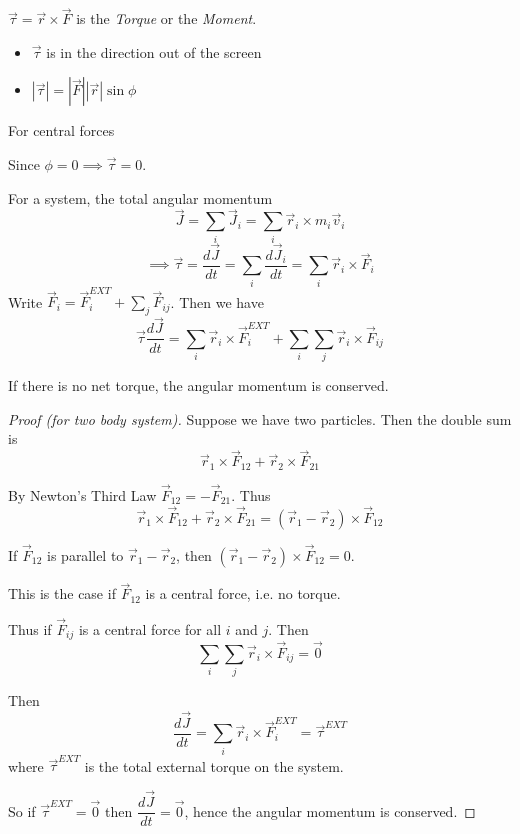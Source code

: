 \documentclass[10pt]{scrartcl}
\begin{document}
\begin{definition}
$\vec{\tau} = \vec{r} \times \vec{F}$ is the \emph{Torque} or the \emph{Moment}. 
\vspace*{50pt}
\begin{itemize}
\item $\vec{\tau}$ is in the direction out of the screen
\item $|\vec{\tau}| = |\vec{F}||\vec{r}|\sin\phi$ 	
\end{itemize}
\end{definition}

For central forces 
\vspace*{50pt}

Since $\phi = 0 \implies \vec{\tau} = 0$. 

For a system, the total angular momentum
\[\vec{J} = \sum_{i}\vec{J}_i = \sum_i\vec{r}_i \times m_i \vec{v}_i\]
\[\implies \vec{\tau} = \frac{d\vec{J}}{dt} = \sum_i\dfrac{d\vec{J}_i}{dt} = \sum_i\vec{r}_i\times\vec{F}_i\]
Write $\vec{F}_i = \vec{F}_i^{EXT} + \sum_j\vec{F}_{ij}$. Then we have
\begin{equation} \vec{\tau} \frac{d\vec{J}}{dt} = \sum_i\vec{r}_i\times\vec{F}_i^{EXT} + \sum_i\sum_j\vec{r}_i\times\vec{F}_{ij}\end{equation}


\begin{theorem}
If there is no net torque, the angular momentum is conserved.
\end{theorem}

\begin{proof}[Proof (for two body system)]

Suppose we have two particles. Then the double sum is 
\[\vec{r}_1 \times\vec{F}_{12} +\vec{r}_2 \times\vec{F}_{21} \]

By Newton's Third Law $\vec{F}_{12} = -\vec{F}_{21}$. Thus
\[\vec{r}_1 \times\vec{F}_{12} +\vec{r}_2 \times\vec{F}_{21} = (\vec{r}_1 - \vec{r}_2) \times \vec{F}_{12}\]

If $\vec{F}_{12}$ is parallel to $\vec{r}_1 - \vec{r}_2$, then $(\vec{r}_1 - \vec{r}_2) \times \vec{F}_{12} = 0$. 

This is the case if $\vec{F}_{12}$ is a central force, i.e. no torque. 

Thus if $\vec{F}_{ij}$ is a central force for all $i$ and $j$. Then 
\[\sum_i\sum_j \vec{r}_i \times \vec{F}_{ij} = \vec{0}\]

Then 
\[\frac{d\vec{J}}{dt} = \sum_i\vec{r}_i \times \vec{F}_i^{EXT} = \vec{\tau}^{EXT}\]
where $\vec{\tau}^{EXT}$ is the total external torque on the system.

So if $\vec{\tau}^{EXT} = \vec{0}$ then $\dfrac{d\vec{J}}{dt} = \vec{0}$, hence the angular momentum is conserved.
\end{proof}
\end{document}
